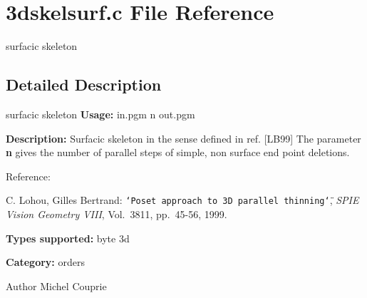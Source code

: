 \section{3dskelsurf.c File Reference}
\label{3dskelsurf_8c}


surfacic skeleton  




\subsection{Detailed Description}
surfacic skeleton {\bfseries Usage:} in.pgm n out.pgm

{\bfseries Description:} Surfacic skeleton in the sense defined in ref. [LB99] The parameter {\bfseries n} gives the number of parallel steps of simple, non surface end point deletions.

Reference:\par
 [LB99] C. Lohou, Gilles Bertrand: {\tt \char`\"{}Poset approach to 3D parallel thinning\char`\"{}}, {\itshape SPIE Vision Geometry VIII\/}, Vol.~3811, pp.~45-\/56, 1999.

{\bfseries Types supported:} byte 3d

{\bfseries Category:} orders

\begin{DoxyAuthor}{Author}
Michel Couprie 
\end{DoxyAuthor}
